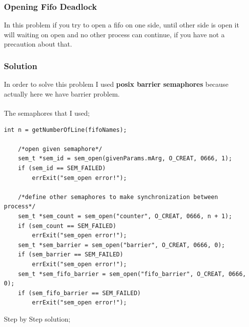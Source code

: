 \documentclass{article}
\begin{document}
\subsubsection{Opening Fifo Deadlock}
In this problem if you try to open a fifo on one side, until other side is open it will waiting on open and no other process can continue, 
if you have not a precaution about that.
\subsubsection{Solution}
In order to solve this problem I used \textbf{posix barrier semaphores} because actually here we have barrier problem. \\ \\
The semaphores that I used;
\cleardoublepage
\begin{lstlisting}[style=CStyle]
    int n = getNumberOfLine(fifoNames);

    /*open given semaphore*/
    sem_t *sem_id = sem_open(givenParams.mArg, O_CREAT, 0666, 1);
    if (sem_id == SEM_FAILED)
        errExit("sem_open error!");

    /*define other semaphores to make synchronization between process*/
    sem_t *sem_count = sem_open("counter", O_CREAT, 0666, n + 1);
    if (sem_count == SEM_FAILED)
        errExit("sem_open error!");
    sem_t *sem_barrier = sem_open("barrier", O_CREAT, 0666, 0);
    if (sem_barrier == SEM_FAILED)
        errExit("sem_open error!");
    sem_t *sem_fifo_barrier = sem_open("fifo_barrier", O_CREAT, 0666, 0);
    if (sem_fifo_barrier == SEM_FAILED)
        errExit("sem_open error!");
\end{lstlisting}
Step by Step solution;
\end{document}
